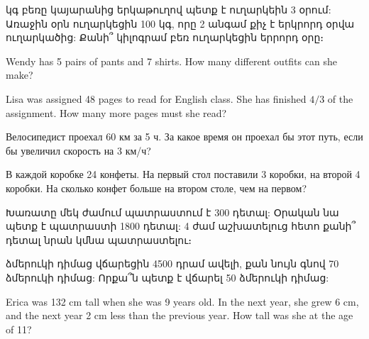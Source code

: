  կգ բեռը կայարանից երկաթուղով պետք է
ուղարկեին 3 օրում: Առաջին օրն ուղարկեցին 100 կգ, որը
2 անգամ քիչ է երկրորդ օրվա ուղարկածից: Քանի՞ կիլոգրամ
բեռ ուղարկեցին երրորդ օրը։

\textproblem Wendy has 5 pairs of pants and 7
shirts. How many different outfits can she make?

\textproblem Lisa was assigned 48 pages to read
for English class. She has finished $4/3$ of
the assignment. How many more pages must she read?

\textproblem Велосипедист проехал 60 км за 5 ч. За
какое время он проехал бы этот путь, если бы увеличил
скорость на 3 км/ч?

\textproblem В каждой коробке 24 конфеты. На первый стол
поставили 3 коробки, на второй 4 коробки. На сколько конфет
больше на втором столе, чем на первом?


\textproblem Խառատը մեկ ժամում պատրաստում է 300 դետալ:
Օրական նա պետք է պատրաստի 1800 դետալ: 4 ժամ աշխատելուց
հետո քանի՞ դետալ նրան կմնա պատրաստելու։

 ձմերուկի դիմաց վճարեցին 4500 դրամ ավելի,
քան նույն գնով 70 ձմերուկի դիմաց: Որքա՞ն պետք է վճարել 50
ձմերուկի դիմաց:


\textproblem Erica was 132 cm tall when she was 9 years
old. In the next year, she grew 6 cm, and the next year
2 cm less than the previous year. How tall was she at
the age of 11?








\bye
